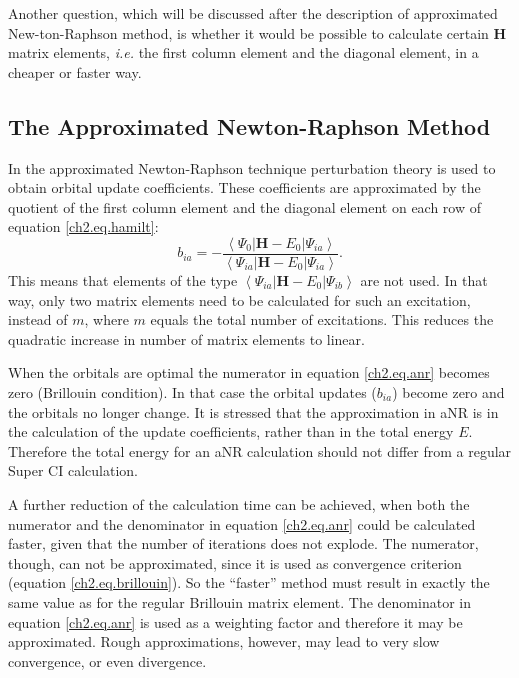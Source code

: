 Another question, which will be discussed after the description of approximated New{-}ton-Raphson method, is whether it would be possible to calculate certain $\mathbf{H}$ matrix elements, \textit{i.e.} the first column element and the diagonal element, in a cheaper or faster way. 

\subsection{\label{ch2.sec.anr}The Approximated Newton-Raphson Method}

In the approximated Newton-Raphson technique perturbation theory is used to obtain orbital update coefficients. These coefficients are approximated by the quotient of the first column element and the diagonal element on each row of equation \ref{ch2.eq.hamilt}:
\begin{equation}
b_{ia}= - \frac{\left< \Psi_{0} | \mathbf{H}-E_0 | \Psi_{ia} \right>}{\left< \Psi_{ia} | \mathbf{H}-E_0 | \Psi_{ia} \right>}.
\label{ch2.eq.anr}
\end{equation}
This means that elements of the type $\left< \Psi_{ia} | \mathbf{H}-E_0 | \Psi_{ib} \right>$ are not used. In that way, only two matrix elements need to be calculated for such an excitation, instead of $m$, where $m$ equals the total number of excitations. This reduces the quadratic increase in number of matrix elements to linear.

When the orbitals are optimal the numerator in equation \ref{ch2.eq.anr} becomes zero (Brillouin condition). In that case the orbital updates ($b_{ia}$) become zero and the orbitals no longer change. It is stressed that the approximation in aNR is in the calculation of the update coefficients, rather than in the total energy $E$. Therefore the total energy for an aNR calculation should not differ from a regular Super CI calculation.

A further reduction of the calculation time can be achieved, when both the numerator and the denominator in equation \ref{ch2.eq.anr} could be calculated faster, given that the number of iterations does not explode. The numerator, though, can not be approximated, since it is used as convergence criterion (equation \ref{ch2.eq.brillouin}). So the ``faster'' method must result in exactly the same value as for the regular Brillouin matrix element. The denominator in equation \ref{ch2.eq.anr} is used as a weighting factor and therefore it may be approximated. Rough approximations, however, may lead to very slow convergence, or even divergence. 

